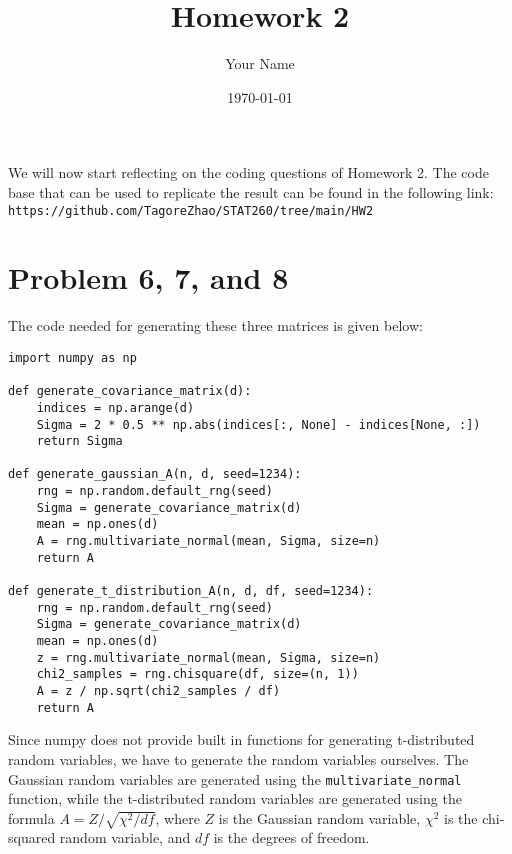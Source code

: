 \documentclass{article}
\title{Homework 2}
\author{Your Name}
\date{\today}
\begin{document}
\maketitle


We will now start reflecting on the coding questions of Homework 2. The code base that can be used to replicate the result can be found
in the following link: \texttt{https://github.com/TagoreZhao/STAT260/tree/main/HW2}

\section{Problem 6, 7, and 8}

The code needed for generating these three matrices is given below:

\begin{lstlisting}[caption={Python code for generating matrices}]
import numpy as np

def generate_covariance_matrix(d):
    indices = np.arange(d)
    Sigma = 2 * 0.5 ** np.abs(indices[:, None] - indices[None, :])
    return Sigma

def generate_gaussian_A(n, d, seed=1234):
    rng = np.random.default_rng(seed)
    Sigma = generate_covariance_matrix(d)
    mean = np.ones(d)
    A = rng.multivariate_normal(mean, Sigma, size=n)
    return A

def generate_t_distribution_A(n, d, df, seed=1234):
    rng = np.random.default_rng(seed)
    Sigma = generate_covariance_matrix(d)
    mean = np.ones(d)
    z = rng.multivariate_normal(mean, Sigma, size=n)
    chi2_samples = rng.chisquare(df, size=(n, 1))
    A = z / np.sqrt(chi2_samples / df)
    return A
\end{lstlisting}
Since numpy does not provide built in functions for generating t-distributed random variables, we have to generate the random variables
ourselves. The Gaussian random variables are generated using the \texttt{multivariate\_normal}
function, while the t-distributed random variables are generated using the formula $A = Z / \sqrt{\chi^2 / df}$, where $Z$ is the Gaussian
random variable, $\chi^2$ is the chi-squared random variable, and $df$ is the degrees of freedom.
\newpage
\end{document}
